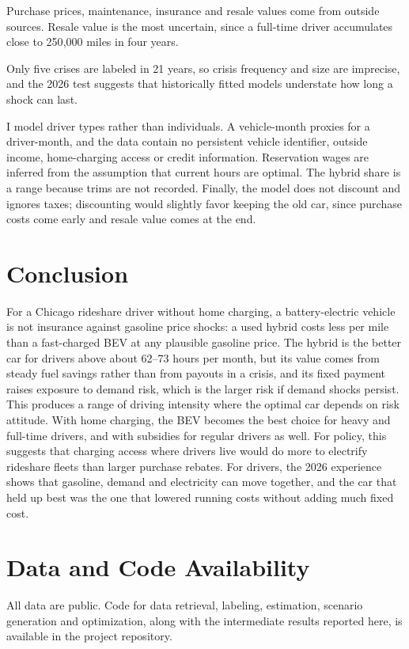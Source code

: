 \documentclass[11pt]{article}
\begin{document}
Purchase prices, maintenance, insurance and resale values come from outside sources. Resale value is the most uncertain, since a full-time driver accumulates close to 250{,}000 miles in four years.

Only five crises are labeled in 21 years, so crisis frequency and size are imprecise, and the 2026 test suggests that historically fitted models understate how long a shock can last.

I model driver types rather than individuals. A vehicle-month proxies for a driver-month, and the data contain no persistent vehicle identifier, outside income, home-charging access or credit information. Reservation wages are inferred from the assumption that current hours are optimal. The hybrid share is a range because trims are not recorded. Finally, the model does not discount and ignores taxes; discounting would slightly favor keeping the old car, since purchase costs come early and resale value comes at the end.

\section{Conclusion}\label{sec:conclusion}

For a Chicago rideshare driver without home charging, a battery-electric vehicle is not insurance against gasoline price shocks: a used hybrid costs less per mile than a fast-charged BEV at any plausible gasoline price. The hybrid is the better car for drivers above about 62--73 hours per month, but its value comes from steady fuel savings rather than from payouts in a crisis, and its fixed payment raises exposure to demand risk, which is the larger risk if demand shocks persist. This produces a range of driving intensity where the optimal car depends on risk attitude. With home charging, the BEV becomes the best choice for heavy and full-time drivers, and with subsidies for regular drivers as well. For policy, this suggests that charging access where drivers live would do more to electrify rideshare fleets than larger purchase rebates. For drivers, the 2026 experience shows that gasoline, demand and electricity can move together, and the car that held up best was the one that lowered running costs without adding much fixed cost.

\section*{Data and Code Availability}

All data are public. Code for data retrieval, labeling, estimation, scenario generation and optimization, along with the intermediate results reported here, is available in the project repository.
\end{document}
